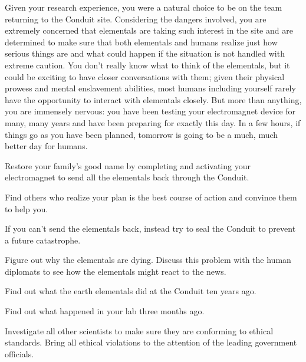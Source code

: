 \documentclass[char]{elementals}
\begin{document}
Given your research experience, you were a natural choice to be on the team returning to the Conduit site. Considering the dangers involved, you are extremely concerned that elementals are taking such interest in the site and are determined to make sure that both elementals and humans realize just how serious things are and what could happen if the situation is not handled with extreme caution. You don't really know what to think of the elementals, but it could be exciting to have closer conversations with them; given their physical prowess and mental enslavement abilities, most humans including yourself rarely have the opportunity to interact with elementals closely. But more than anything, you are immensely nervous: you have been testing your electromagnet device for many, many years and have been preparing for exactly this day. In a few hours, if things go as you have been planned, tomorrow is going to be a much, much better day for humans.


\begin{itemz}[Goals]
  \item Restore your family's good name by completing and activating your electromagnet to send all the elementals back through the Conduit.
  \item Find others who realize your plan is the best course of action and convince them to help you. %
  \item If you can't send the elementals back, instead try to seal the Conduit to prevent a future catastrophe.
  \item Figure out why the elementals are dying. Discuss this problem with the human diplomats to see how the elementals might react to the news.
  \item Find out what the earth elementals did at the Conduit ten years ago.
  \item Find out what happened in your lab three months ago.
  \item Investigate all other scientists to make sure they are conforming to ethical standards. Bring all ethical violations to the attention of the leading government officials.
\end{itemz}
\end{document}
